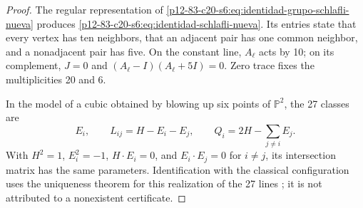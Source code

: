 \begin{proof}
The regular representation of
\cref{p12-83-c20-s6:eq:identidad-grupo-schlafli-nueva} produces
\cref{p12-83-c20-s6:eq:identidad-schlafli-nueva}. Its entries state that every vertex
has ten neighbors, that an adjacent pair has one common neighbor, and a
nonadjacent pair has five. On the constant line, \(A_\ell\) acts by 10;
on its complement, \(J=0\) and
\((A_\ell-I)(A_\ell+5I)=0\). Zero trace fixes the multiplicities 20 and 6.

In the model of a cubic obtained by blowing up six points of
\(\mathbb P^2\), the 27 classes are
\[
 E_i,\qquad L_{ij}=H-E_i-E_j,\qquad
 Q_i=2H-\sum_{j\ne i}E_j.
\]
With \(H^2=1\), \(E_i^2=-1\), \(H\cdot E_i=0\), and
\(E_i\cdot E_j=0\) for \(i\ne j\), its intersection matrix has the
same parameters. Identification with the classical configuration uses the
uniqueness theorem for this realization of the 27 lines
\cite{Manivel2005}; it is not attributed to a nonexistent certificate.
\end{proof}

